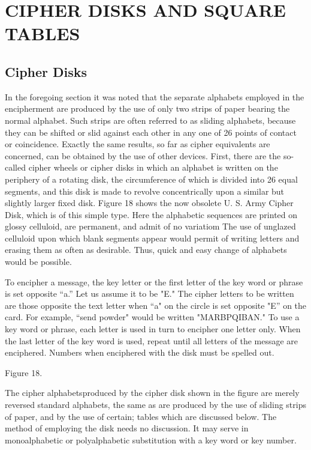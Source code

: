 \section{CIPHER DISKS AND SQUARE TABLES}
\subsection{Cipher Disks}

\mypara In the foregoing section it was noted that the separate alphabets
employed in the encipherment are produced by the use of only two strips
of paper bearing the normal alphabet. Such strips are often referred to
as sliding alphabets, because they can be shifted or slid against each other
in any one of 26 points of contact or coincidence. Exactly the same
results, so far as cipher equivalents are concerned, can be obtained by the
use of other devices. First, there are the so-called cipher wheels or cipher
disks in which an alphabet is written on the periphery of a rotating disk,
the circumference of which is divided into 26 equal segments, and this
disk is made to revolve concentrically upon a similar but slightly larger
ﬁxed disk. Figure 18 shows the now obsolete U. S. Army Cipher Disk,
which is of this simple type. Here the alphabetic sequences are printed
on glossy celluloid, are permanent, and admit of no variatiom The
use of unglazed celluloid upon which blank segments appear would
permit of writing letters and erasing them as often as desirable. Thus,
quick and easy change of alphabets would be possible.


To encipher a message, the key letter or the ﬁrst letter of the
key word or phrase is set opposite “a.” Let us assume it
to be "E." The cipher letters to be written are those
opposite the text letter when “a" on the circle is set
opposite "E” on the card. For example, “send powder"
would be written "MARBPQIBAN." To use a key word
or phrase, each letter is used in turn to encipher one letter
only. When the last letter of the key word is used, repeat
until all letters of the message are enciphered. Numbers
when enciphered with the disk must be spelled out.

Figure 18.

 

 

 


\mypara The cipher alphabetsproduced by the cipher disk shown in the
ﬁgure are merely reversed standard alphabets, the same as are produced
by the use of sliding strips of paper, and by the use of certain; tables
which are discussed below. The method of employing the disk needs no
discussion. It may serve in monoalphabetic or polyalphabetic substitution
with a key word or key number.

